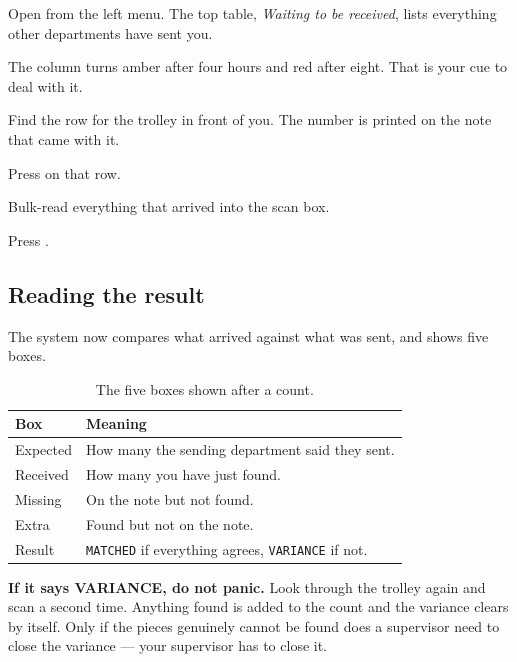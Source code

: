 Open  from the left menu. The top table, \emph{Waiting to be
received}, lists everything other departments have sent you.


The  column turns amber after four hours and red after eight.
That is your cue to deal with it.

\begin{steps}
  \item Find the row for the trolley in front of you. The 
        number is printed on the note that came with it.
  \item Press  on that row.
  \item Bulk-read everything that arrived into the scan box.
  \item Press .
\end{steps}

\subsection{Reading the result}

The system now compares what arrived against what was sent, and shows five boxes.


\begin{table}[H]
\centering
\small
\begin{tabular}{@{}p{24mm}p{110mm}@{}}
\toprule
\textbf{Box} & \textbf{Meaning} \\
\midrule
Expected & How many the sending department said they sent. \\
Received & How many you have just found. \\
Missing  & On the note but not found. \\
Extra    & Found but not on the note. \\
Result   & \texttt{MATCHED} if everything agrees, \texttt{VARIANCE} if not. \\
\bottomrule
\end{tabular}
\caption{The five boxes shown after a count.}
\end{table}

\begin{tipbox}
\textbf{If it says VARIANCE, do not panic.} Look through the trolley again and
scan a second time. Anything found is added to the count and the variance clears
by itself. Only if the pieces genuinely cannot be found does a supervisor need to
close the variance --- your supervisor has to close it.
\end{tipbox}


